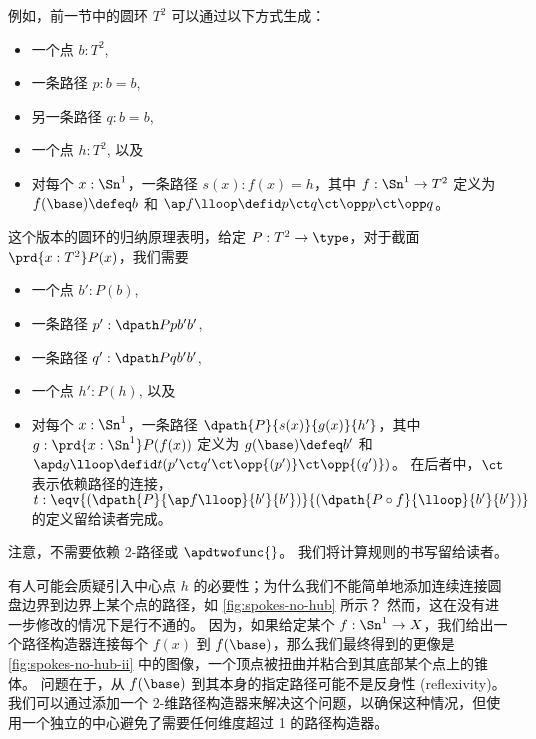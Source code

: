 例如，前一节中的圆环 $T^2$ 可以通过以下方式生成：
\begin{itemize}
  \item 一个点 $b:T^2$,
  \item 一条路径 $p:b=b$,
  \item 另一条路径 $q:b=b$,
  \item 一个点 $h:T^2$, 以及
  \item 对每个 $x:\Sn^1$，一条路径 $s(x) : f(x)=h$，其中 $f:\Sn^1\to T^2$ 定义为 $f(\base)\defeq b$ 和 $\ap f \lloop \defid p \ct q \ct \opp p \ct \opp q$。
\end{itemize}
这个版本的圆环的归纳原理表明，给定 $P:T^2\to\type$，对于截面 $\prd{x:T^2} P(x)$，我们需要
\begin{itemize}
  \item 一个点 $b':P(b)$,
  \item 一条路径 $p' : \dpath P p {b'} {b'}$,
  \item 一条路径 $q' : \dpath P q {b'} {b'}$,
  \item 一个点 $h':P(h)$, 以及
  \item 对每个 $x:\Sn^1$，一条路径 $\dpath {P}{s(x)}{g(x)}{h'}$，其中 $g:\prd{x:\Sn^1} P(f(x))$ 定义为 $g(\base)\defeq b'$ 和 $\apd g \lloop \defid t(p' \ct q' \ct \opp{(p')} \ct \opp{(q')})$。
  在后者中，$\ct$ 表示依赖路径的连接，$t:\eqv{(\dpath{P}{\ap f \lloop}{b'}{b'})}{(\dpath{P\circ f}{\lloop}{b'}{b'})}$ 的定义留给读者完成。
\end{itemize}
注意，不需要依赖 2-路径或 $\apdtwofunc{}$。
我们将计算规则的书写留给读者。

\begin{rmk}\label{rmk:spokes-no-hub}
有人可能会质疑引入中心点 $h$ 的必要性；为什么我们不能简单地添加连续连接圆盘边界到边界上某个点的路径，如 \cref{fig:spokes-no-hub} 所示？
然而，这在没有进一步修改的情况下是行不通的。
因为，如果给定某个 $f:\Sn^1 \to X$，我们给出一个路径构造器连接每个 $f(x)$ 到 $f(\base)$，那么我们最终得到的更像是 \cref{fig:spokes-no-hub-ii} 中的图像，一个顶点被扭曲并粘合到其底部某个点上的锥体。
问题在于，从 $f(\base)$ 到其本身的指定路径可能不是反身性 (reflexivity)。
我们可以通过添加一个 2-维路径构造器来解决这个问题，以确保这种情况，但使用一个独立的中心避免了需要任何维度超过 1 的路径构造器。
\end{rmk}

